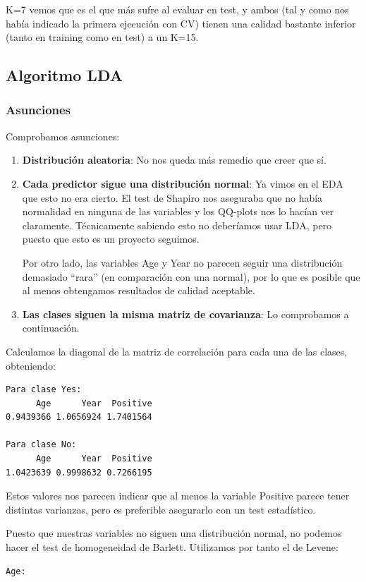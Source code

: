 K=7 vemos que es el que más sufre al evaluar en test, y ambos (tal y como nos había indicado la primera ejecución con CV) tienen una calidad bastante inferior (tanto en training como en test) a un K=15.

\subsection{Algoritmo LDA}
\subsubsection{Asunciones}
Comprobamos asunciones:
\begin{enumerate}
    \item \textbf{Distribución aleatoria}: No nos queda más remedio que creer que sí.
    \item \textbf{Cada predictor sigue una distribución normal}: Ya vimos en el EDA que esto no era cierto. El test de Shapiro nos aseguraba que no había normalidad en ninguna de las variables y los QQ-plots nos lo hacían ver claramente. Técnicamente sabiendo esto no deberíamos usar LDA, pero puesto que esto es un proyecto seguimos.
    
    Por otro lado, las variables Age y Year no parecen seguir una distribución demasiado ``rara'' (en comparación con una normal), por lo que es posible que al menos obtengamos resultados de calidad aceptable.
    \item \textbf{Las clases siguen la misma matriz de covarianza}: Lo comprobamos a continuación.
\end{enumerate}

Calculamos la diagonal de la matriz de correlación para cada una de las clases, obteniendo:
\begin{verbatim}
Para clase Yes:
      Age      Year  Positive 
0.9439366 1.0656924 1.7401564 

Para clase No:
      Age      Year  Positive 
1.0423639 0.9998632 0.7266195 
\end{verbatim}

\vspace{\baselineskip}

Estos valores nos parecen indicar que al menos la variable Positive parece tener distintas varianzas, pero es preferible asegurarlo con un test estadístico.

Puesto que nuestras variables no siguen una distribución normal, no podemos hacer el test de homogeneidad de Barlett. Utilizamos por tanto el de Levene:
\begin{verbatim}
Age:
\end{verbatim}

